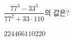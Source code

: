 $\dfrac{77^3-33^3}{77^2+33\cdot 110}$의 값은?
\begin{choices32}{$22$}{$44$}{$66$}{$110$}{$220$}\end{choices32}
